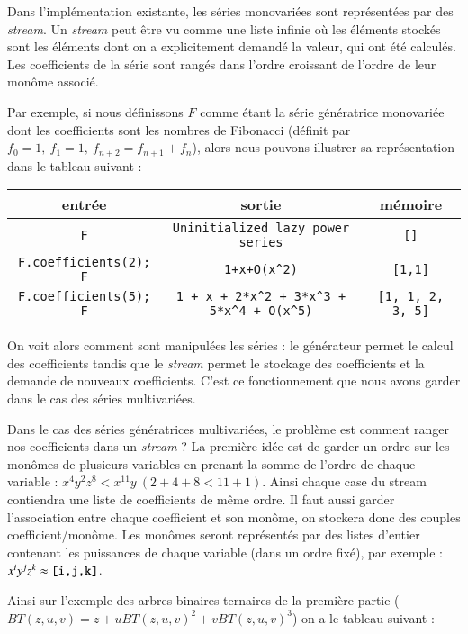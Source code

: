 \documentclass[12pt]{article}
\begin{document}
Dans l'implémentation existante, les séries monovariées sont représentées par
des \emph{stream}. Un \emph{stream} peut être vu comme une liste infinie où
les éléments stockés sont les éléments dont on a explicitement demandé la
valeur, qui ont été calculés. Les coefficients de la série sont rangés
dans l'ordre croissant de l'ordre de leur monôme associé. 


Par exemple, si nous définissons $F$ comme étant la série génératrice
monovariée dont les coefficients sont les nombres de Fibonacci (définit par
$f_0=1,\ f_1=1,\ f_{n+2} = f_{n+1} + f_n$), alors nous pouvons illustrer sa
représentation dans le tableau suivant :

\begin{center}
\begin{tabular}{|c|c|c|}
\hline
entrée & sortie  &  mémoire \\
\hline
\verb|F| & \verb|Uninitialized lazy power series| & \verb|[]| \\
\verb|F.coefficients(2); F| & \verb|1+x+O(x^2)| & \verb|[1,1]| \\
\verb|F.coefficients(5); F| & \verb|1 + x + 2*x^2 + 3*x^3 + 5*x^4 + O(x^5)| &
\verb|[1, 1, 2, 3, 5]| \\
\hline
\end{tabular}
\end{center}

On voit alors comment sont manipulées les séries : le générateur permet le
calcul des coefficients tandis que le \emph{stream} permet le stockage des
coefficients et la demande de nouveaux coefficients. C'est ce fonctionnement
que nous avons garder dans le cas des séries multivariées.

\vspace{3mm}

Dans le cas des séries génératrices multivariées, le problème est comment
ranger nos coefficients dans un \emph{stream} ? La première idée est de garder
un ordre sur les monômes de plusieurs variables en prenant la somme de l'ordre
de chaque variable : $x^4 y^2 z^8 < x^{11} y \ (2+4+8 < 11+1)$. Ainsi chaque
case du stream contiendra une liste de coefficients de même ordre. Il faut
aussi garder l'association entre chaque coefficient et son monôme, on stockera
donc des couples coefficient/monôme. Les monômes seront représentés par
des listes d'entier contenant les puissances de chaque variable (dans un ordre
fixé), par exemple : $x^iy^jz^k \approx \verb|[i,j,k]|$.


Ainsi sur l'exemple des arbres binaires-ternaires de la première partie
($BT(z,u,v) = z+uBT(z,u,v)^2+vBT(z,u,v)^3$)
on a le tableau suivant :
\end{document}
